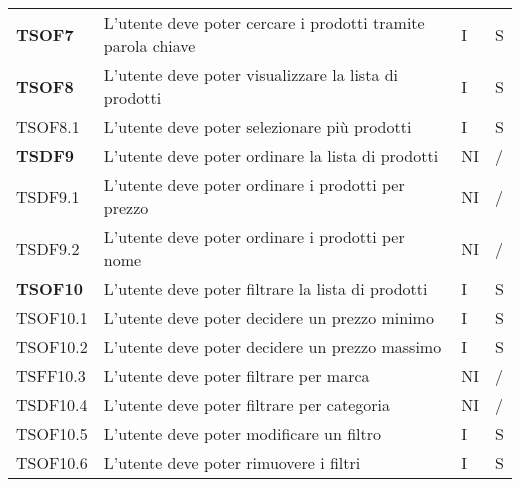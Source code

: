 \begin{center}
\begin{longtable}[!h]{p{60px} p{240px} p{35px} p{35px}}
        \textbf{TSOF7}  & L'utente deve poter cercare i prodotti tramite parola chiave                                        & I              & S              \\
        \textbf{TSOF8}  & L'utente deve poter visualizzare la lista di prodotti                                               & I              & S              \\
        TSOF8.1         & L'utente deve poter selezionare più prodotti                                                        & I              & S              \\
        \textbf{TSDF9}  & L'utente deve poter ordinare la lista di prodotti                                                   & NI             & /              \\
        TSDF9.1         & L'utente deve poter ordinare i prodotti per prezzo                                                  & NI             & /              \\
        TSDF9.2         & L'utente deve poter ordinare i prodotti per nome                                                    & NI             & /              \\
        \textbf{TSOF10} & L'utente deve poter filtrare la lista di prodotti                                                   & I              & S              \\
        TSOF10.1        & L'utente deve poter decidere un prezzo minimo                                                       & I              & S              \\
        TSOF10.2        & L'utente deve poter decidere un prezzo massimo                                                      & I              & S              \\
        TSFF10.3        & L'utente deve poter filtrare per marca                                                              & NI             & /              \\
        TSDF10.4        & L'utente deve poter filtrare per categoria                                                          & NI             & /              \\
        TSOF10.5        & L'utente deve poter modificare un filtro                                                            & I              & S              \\
        TSOF10.6        & L'utente deve poter rimuovere i filtri                                                              & I              & S              \\

\end{longtable}
\end{center}
